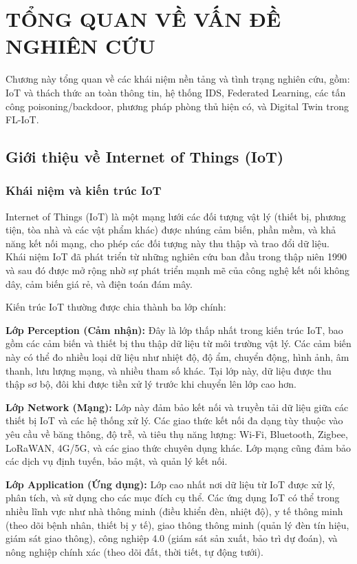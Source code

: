 \chapter{TỔNG QUAN VỀ VẤN ĐỀ NGHIÊN CỨU}
\label{Chapter2}

Chương này tổng quan về các khái niệm nền tảng và tình trạng nghiên cứu, gồm: IoT và thách thức an toàn thông tin, hệ thống IDS, Federated Learning, các tấn công poisoning/backdoor, phương pháp phòng thủ hiện có, và Digital Twin trong FL-IoT.

\section{Giới thiệu về Internet of Things (IoT)}

\subsection{Khái niệm và kiến trúc IoT}
Internet of Things (IoT) là một mạng lưới các đối tượng vật lý (thiết bị, phương tiện, tòa nhà và các vật phẩm khác) được nhúng cảm biến, phần mềm, và khả năng kết nối mạng, cho phép các đối tượng này thu thập và trao đổi dữ liệu. Khái niệm IoT đã phát triển từ những nghiên cứu ban đầu trong thập niên 1990 và sau đó được mở rộng nhờ sự phát triển mạnh mẽ của công nghệ kết nối không dây, cảm biến giá rẻ, và điện toán đám mây.

Kiến trúc IoT thường được chia thành ba lớp chính:

\textbf{Lớp Perception (Cảm nhận):} Đây là lớp thấp nhất trong kiến trúc IoT, bao gồm các cảm biến và thiết bị thu thập dữ liệu từ môi trường vật lý. Các cảm biến này có thể đo nhiều loại dữ liệu như nhiệt độ, độ ẩm, chuyển động, hình ảnh, âm thanh, lưu lượng mạng, và nhiều tham số khác. Tại lớp này, dữ liệu được thu thập sơ bộ, đôi khi được tiền xử lý trước khi chuyển lên lớp cao hơn.

\textbf{Lớp Network (Mạng):} Lớp này đảm bảo kết nối và truyền tải dữ liệu giữa các thiết bị IoT và các hệ thống xử lý. Các giao thức kết nối đa dạng tùy thuộc vào yêu cầu về băng thông, độ trễ, và tiêu thụ năng lượng: Wi-Fi, Bluetooth, Zigbee, LoRaWAN, 4G/5G, và các giao thức chuyên dụng khác. Lớp mạng cũng đảm bảo các dịch vụ định tuyến, bảo mật, và quản lý kết nối.

\textbf{Lớp Application (Ứng dụng):} Lớp cao nhất nơi dữ liệu từ IoT được xử lý, phân tích, và sử dụng cho các mục đích cụ thể. Các ứng dụng IoT có thể trong nhiều lĩnh vực như nhà thông minh (điều khiển đèn, nhiệt độ), y tế thông minh (theo dõi bệnh nhân, thiết bị y tế), giao thông thông minh (quản lý đèn tín hiệu, giám sát giao thông), công nghiệp 4.0 (giám sát sản xuất, bảo trì dự đoán), và nông nghiệp chính xác (theo dõi đất, thời tiết, tự động tưới).

